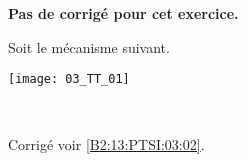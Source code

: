 \normaltrue
\correctionfalse



\setcounter{numques}{0}
\ifcorrection
\else
\textbf{Pas de corrigé pour cet exercice.}
\fi

\ifprof
\else
Soit le mécanisme suivant. 
\begin{center}
\texttt{[image: 03\_TT\_01]}
\end{center}
\fi

\ifprof~\\ 

\else
\fi

\ifprof
\else
\footnotesize

\normalsize

\begin{flushright}
\footnotesize{Corrigé  voir \ref{B2:13:PTSI:03:02}.}
\end{flushright}%
\fi



